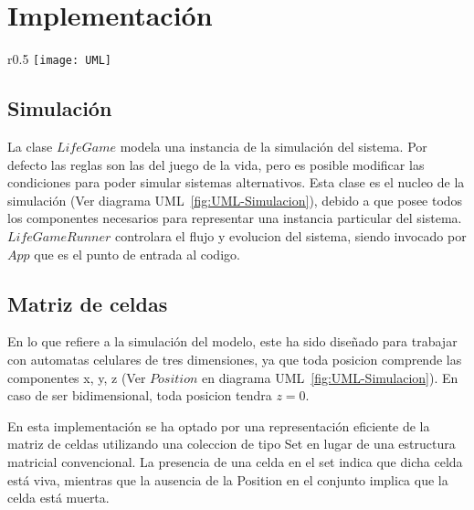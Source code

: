 \section{Implementación}\label{sec:implementacion}

\begin{wrapfigure}{r}{0.5\textwidth}
    \centering
    \texttt{[image: UML]}
    \caption{Diagrama UML}
    \label{fig:UML-Simulacion}
\end{wrapfigure}

\subsection{Simulación}\label{label:simulacion}
    La clase $LifeGame$ modela una instancia de la simulación del sistema. Por defecto las reglas son las del juego de la vida,
    pero es posible modificar las condiciones para poder simular sistemas alternativos. Esta clase es el nucleo de la
    simulación (Ver diagrama UML~\ref{fig:UML-Simulacion}), debido a que posee todos los componentes necesarios
    para representar una instancia particular del sistema. $LifeGameRunner$ controlara el flujo y evolucion del sistema,
    siendo invocado por $App$ que es el punto de entrada al codigo.

\subsection{Matriz de celdas}\label{subsec:matriz de celdas}
    En lo que refiere a la simulación del modelo, este ha sido diseñado para trabajar con automatas celulares de tres
    dimensiones, ya que toda posicion comprende las componentes x, y, z (Ver $Position$ en diagrama UML~\ref{fig:UML-Simulacion}).
    En caso de ser bidimensional, toda posicion tendra $z = 0$.

    En esta implementación se ha optado por una representación eficiente de la matriz de celdas utilizando una coleccion de
    tipo Set en lugar de una estructura matricial convencional.
    La presencia de una celda en el set indica que dicha celda está viva, mientras que la ausencia de la Position en
    el conjunto implica que la celda está muerta.

